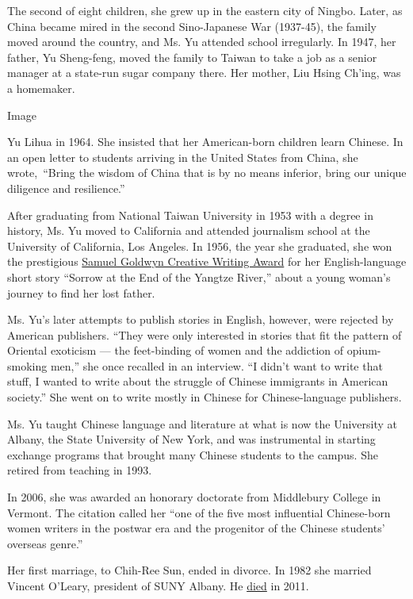 The second of eight children, she grew up in the eastern city of Ningbo.
Later, as China became mired in the second Sino-Japanese War (1937-45),
the family moved around the country, and Ms. Yu attended school
irregularly. In 1947, her father, Yu Sheng-feng, moved the family to
Taiwan to take a job as a senior manager at a state-run sugar company
there. Her mother, Liu Hsing Ch'ing, was a homemaker.

Image

Yu Lihua in 1964. She insisted that her American-born children learn
Chinese. In an open letter to students arriving in the United States
from China, she wrote,~``Bring the wisdom of China that is by no means
inferior, bring our unique diligence and resilience.''

After graduating from National Taiwan University in 1953 with a degree
in history, Ms. Yu moved to California and attended journalism school at
the University of California, Los Angeles. In 1956, the year she
graduated, she won the prestigious
\href{https://timesmachine.nytimes.com/timesmachine/1956/06/01/86601140.pdf?pdf_redirect=true\&ip=0}{Samuel
Goldwyn Creative Writing Award} for her English-language short story
``Sorrow at the End of the Yangtze River,'' about a young woman's
journey to find her lost father.

Ms. Yu's later attempts to publish stories in English, however, were
rejected by American publishers. ``They were only interested in stories
that fit the pattern of Oriental exoticism --- the feet-binding of women
and the addiction of opium-smoking men,'' she once recalled in an
interview. ``I didn't want to write that stuff, I wanted to write about
the struggle of Chinese immigrants in American society.'' She went on to
write mostly in Chinese for Chinese-language publishers.

Ms. Yu taught Chinese language and literature at what is now the
University at Albany, the State University of New York, and was
instrumental in starting exchange programs that brought many Chinese
students to the campus. She retired from teaching in 1993.

In 2006, she was awarded an honorary doctorate from Middlebury College
in Vermont. The citation called her ``one of the five most influential
Chinese-born women writers in the postwar era and the progenitor of the
Chinese students' overseas genre.''

Her first marriage, to Chih-Ree Sun, ended in divorce. In 1982 she
married Vincent O'Leary, president of SUNY Albany. He
\href{https://archive.nytimes.com/query.nytimes.com/gst/fullpage-980DEEDF1E3BF931A35756C0A9679D8B63.html}{died}
in 2011.

